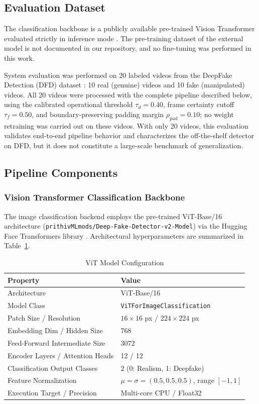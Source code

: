 \documentclass[conference]{IEEEtran}
\begin{document}
\subsection{Evaluation Dataset}
The classification backbone is a publicly available pre-trained Vision Transformer evaluated strictly in inference mode \cite{prithiv2024}. The pre-training dataset of the external model is not documented in our repository, and no fine-tuning was performed in this work.

System evaluation was performed on 20 labeled videos from the DeepFake Detection (DFD) dataset \cite{dufour2019}: 10 real (genuine) videos and 10 fake (manipulated) videos. All 20 videos were processed with the complete pipeline described below, using the calibrated operational threshold $\tau_d = 0.40$, frame certainty cutoff $\tau_f = 0.50$, and boundary-preserving padding margin $\rho_{\text{pad}} = 0.10$; no weight retraining was carried out on these videos. With only 20 videos, this evaluation validates end-to-end pipeline behavior and characterizes the off-the-shelf detector on DFD, but it does not constitute a large-scale benchmark of generalization.

\subsection{Pipeline Components}

\subsubsection{Vision Transformer Classification Backbone}
The image classification backend employs the pre-trained ViT-Base/16 architecture (\texttt{prithivMLmods/Deep-Fake-Detector-v2-Model}) \cite{prithiv2024} via the Hugging Face Transformers library \cite{wolf2020}. Architectural hyperparameters are summarized in Table~\ref{tab:vit}.

\begin{table}[htbp]
\caption{ViT Model Configuration}
\label{tab:vit}
\centering
\setlength{\tabcolsep}{3pt}
\scriptsize
\begin{tabular}{|l|l|}
\hline
\textbf{Property} & \textbf{Value} \\
\hline
Architecture & ViT-Base/16 \\
Model Class & \texttt{ViTForImageClassification} \\
Patch Size / Resolution & $16\times16$ px / $224\times224$ px \\
Embedding Dim / Hidden Size & 768 \\
Feed-Forward Intermediate Size & 3072 \\
Encoder Layers / Attention Heads & 12 / 12 \\
Classification Output Classes & 2 (0: Realism, 1: Deepfake) \\
Feature Normalization & $\mu = \sigma = (0.5, 0.5, 0.5)$, range $[-1, 1]$ \\
Execution Target / Precision & Multi-core CPU / Float32 \\
\hline
\end{tabular}
\end{table}
\end{document}
